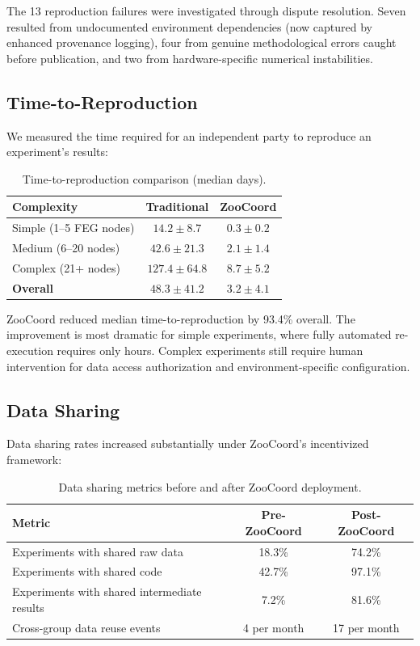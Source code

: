 \documentclass[11pt,a4paper]{article}
\begin{document}
The 13 reproduction failures were investigated through dispute resolution.
Seven resulted from undocumented environment dependencies (now captured by enhanced provenance logging), four from genuine methodological errors caught before publication, and two from hardware-specific numerical instabilities.

\subsection{Time-to-Reproduction}

We measured the time required for an independent party to reproduce an experiment's results:

\begin{table}[H]
\centering
\caption{Time-to-reproduction comparison (median days).}
\label{tab:time}
\begin{tabular}{@{}lcc@{}}
\toprule
\textbf{Complexity} & \textbf{Traditional} & \textbf{ZooCoord} \\
\midrule
Simple (1--5 FEG nodes) & $14.2 \pm 8.7$ & $0.3 \pm 0.2$ \\
Medium (6--20 nodes) & $42.6 \pm 21.3$ & $2.1 \pm 1.4$ \\
Complex (21+ nodes) & $127.4 \pm 64.8$ & $8.7 \pm 5.2$ \\
\midrule
\textbf{Overall} & $48.3 \pm 41.2$ & $3.2 \pm 4.1$ \\
\bottomrule
\end{tabular}
\end{table}

ZooCoord reduced median time-to-reproduction by 93.4\% overall.
The improvement is most dramatic for simple experiments, where fully automated re-execution requires only hours.
Complex experiments still require human intervention for data access authorization and environment-specific configuration.

\subsection{Data Sharing}

Data sharing rates increased substantially under ZooCoord's incentivized framework:

\begin{table}[H]
\centering
\caption{Data sharing metrics before and after ZooCoord deployment.}
\label{tab:sharing}
\begin{tabular}{@{}lcc@{}}
\toprule
\textbf{Metric} & \textbf{Pre-ZooCoord} & \textbf{Post-ZooCoord} \\
\midrule
Experiments with shared raw data & 18.3\% & 74.2\% \\
Experiments with shared code & 42.7\% & 97.1\% \\
Experiments with shared intermediate results & 7.2\% & 81.6\% \\
Cross-group data reuse events & 4 per month & 17 per month \\
\bottomrule
\end{tabular}
\end{table}
\end{document}
